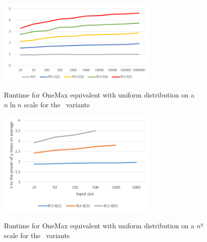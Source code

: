 \begin{figure}[h]
      \caption{Runtime for OneMax equivalent with uniform distribution on a $n\ln n$ scale for the \RLSR~variants}
      \centering
      \includegraphics[width=0.7\textwidth]{figures/images/oneMaxUniformMultipleN_RLSRCompare.png}\label{fig:onemaxniformNlogNBoundRLSR}
\end{figure}


\begin{figure}[h]
      \caption{Runtime for OneMax equivalent with uniform distribution on a $n^y$ scale for the \RLSN~variants}
      \centering
      \includegraphics[width=0.7\textwidth]{figures/images/oneMaxUniformMultipleN_RLSBCompare.png}\label{fig:onemaxniformNlogNBoundRLSB}
\end{figure}
